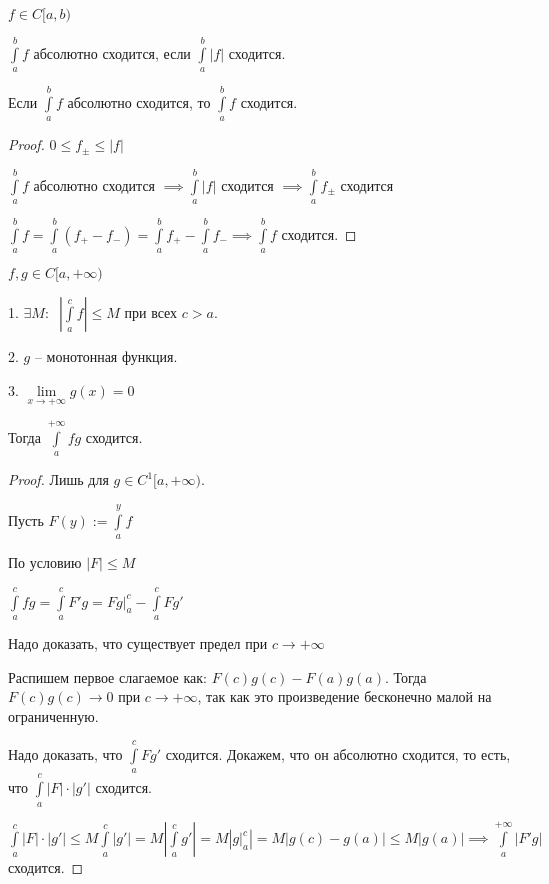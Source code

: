 
\begin{definition} \thmslashn
	
	$f \in C[a,b)$
	
	$\int\limits_a^b f$ абсолютно сходится, если $\int\limits_a^b |f|$ сходится.
	
\end{definition}

\begin{theorem} \thmslashn
	
	Если $\int\limits_a^b f$ абсолютно сходится, то $\int\limits_a^b f$ сходится.
	
\end{theorem} 

\begin{proof} \thmslashn
    
    $ 0 \leq f_{\pm} \leq |f|$
    
    $\int\limits_a^b f$ абсолютно сходится $\implies \int\limits_a^b |f|$ сходится $\implies \int\limits_a^b f_{\pm}$ сходится
    
    $\int\limits_a^b f = \int\limits_a^b (f_{+} - f_{-}) = \int\limits_a^b f_{+} - \int\limits_a^b f_{-} \implies \int\limits_a^b f$ сходится.
    
\end{proof}

\begin{theorem} \thmslashn
	
	$f, g \in C[a,+\infty)$
	
	1. $\exists M : \;\; |\int\limits_a^c f| \leq M$ при всех $c > a$.
	
	2. $g$ -- монотонная функция.
	
	3. $\lim\limits_{x \to +\infty} g(x) = 0$
	
	Тогда $\int\limits_a^{+\infty} fg$ сходится.
\end{theorem}

\begin{proof} \thmslashn

    Лишь для $g \in C^1[a,+\infty)$.
    
    Пусть $F(y) := \int\limits_a^y f$
    
    По условию $|F| \leq M$
    
    $\int\limits_a^c fg = \int\limits_a^c F'g = Fg \Big|_a^c - \int\limits_a^c Fg'$
    
    Надо доказать, что существует предел при  $c \to +\infty$
    
    Распишем первое слагаемое как: $F(c)g(c) - F(a)g(a)$. Тогда $F(c)g(c) \to 0$ при $c \to +\infty$, так как это произведение бесконечно малой на ограниченную.
    
    Надо доказать, что $\int\limits_a^c Fg'$ сходится. Докажем, что он абсолютно сходится, то есть, что $\int\limits_a^c |F| \cdot |g'|$ сходится. 
    
    $\int\limits_a^c |F| \cdot |g'| \leq M \int\limits_a^c |g'| = M |\int\limits_a^c g'| = M | g \Big|_a^c | = M|g(c) - g(a)| \leq M|g(a)| \implies \int\limits_a^{+\infty} |F'g|$ сходится.
    
    
\end{proof}

